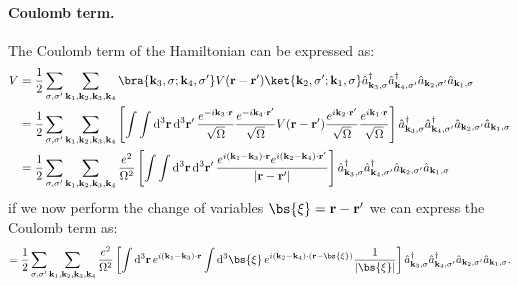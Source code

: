 \paragraph{Coulomb term.}
The Coulomb term of the Hamiltonian can be expressed as:
\[
    \begin{aligned}
        V & = \frac{1}{2} \sum_{\sigma,\sigma^{\prime}} \sum_{\mathbf{k}_1, \mathbf{k}_2, \mathbf{k}_3, \mathbf{k}_4} \bra{\mathbf{k}_3, \sigma; \mathbf{k}_4, \sigma^{\prime}} V(\mathbf{r} - \mathbf{r}') \ket{\mathbf{k}_2, \sigma^{\prime}; \mathbf{k}_1, \sigma} \hat{a}_{\mathbf{k}_3, \sigma}^\dagger \hat{a}_{\mathbf{k}_4, \sigma^{\prime}}^\dagger \hat{a}_{\mathbf{k}_2, \sigma^{\prime}} \hat{a}_{\mathbf{k}_1, \sigma}                                                                                                                                                                                                         \\
          & = \frac{1}{2} \sum_{\sigma,\sigma^{\prime}} \sum_{\mathbf{k}_1, \mathbf{k}_2, \mathbf{k}_3, \mathbf{k}_4} \left[ \int \int \mathrm{d}^3 \mathbf{r} \, \mathrm{d}^3 \mathbf{r}' \, \frac{e^{-i \mathbf{k}_3 \cdot \mathbf{r}}}{\sqrt{\Omega}} \frac{e^{-i \mathbf{k}_4 \cdot \mathbf{r}'}}{\sqrt{\Omega}} V(\mathbf{r} - \mathbf{r}') \frac{e^{i \mathbf{k}_2 \cdot \mathbf{r}'}}{\sqrt{\Omega}} \frac{e^{i \mathbf{k}_1 \cdot \mathbf{r}}}{\sqrt{\Omega}} \right] \hat{a}_{\mathbf{k}_3, \sigma}^\dagger \hat{a}_{\mathbf{k}_4, \sigma^{\prime}}^\dagger \hat{a}_{\mathbf{k}_2, \sigma^{\prime}} \hat{a}_{\mathbf{k}_1, \sigma} \\
          & = \frac{1}{2} \sum_{\sigma,\sigma^{\prime}} \sum_{\mathbf{k}_1, \mathbf{k}_2, \mathbf{k}_3, \mathbf{k}_4} \frac{e^2}{\Omega^2}\left[ \int \int \mathrm{d}^3 \mathbf{r} \, \mathrm{d}^3 \mathbf{r}' \, \frac{e^{i (\mathbf{k}_1 - \mathbf{k}_3) \cdot \mathbf{r}} e^{i (\mathbf{k}_2 - \mathbf{k}_4) \cdot \mathbf{r}'}}{\vert \mathbf{r} - \mathbf{r}^{\prime} \vert} \right] \hat{a}_{\mathbf{k}_3, \sigma}^\dagger \hat{a}_{\mathbf{k}_4, \sigma^{\prime}}^\dagger \hat{a}_{\mathbf{k}_2, \sigma^{\prime}} \hat{a}_{\mathbf{k}_1, \sigma}                                                                                     \\
    \end{aligned}
\]
if we now perform the change of variables $\bs{\xi} = \mathbf{r} - \mathbf{r}'$ we can express the Coulomb term as:
\[
    \begin{aligned}
        = \frac{1}{2} \sum_{\sigma,\sigma^{\prime}} \sum_{\mathbf{k}_1, \mathbf{k}_2, \mathbf{k}_3, \mathbf{k}_4} \frac{e^2}{\Omega^2} \left[ \int \mathrm{d}^3 \mathbf{r} \, e^{i (\mathbf{k}_1 - \mathbf{k}_3) \cdot \mathbf{r}} \int \mathrm{d}^3 \bs{\xi} \, e^{i (\mathbf{k}_2 - \mathbf{k}_4) \cdot (\mathbf{r} - \bs{\xi})} \frac{1}{\vert \bs{\xi} \vert} \right] \hat{a}_{\mathbf{k}_3, \sigma}^\dagger \hat{a}_{\mathbf{k}_4, \sigma^{\prime}}^\dagger \hat{a}_{\mathbf{k}_2, \sigma^{\prime}} \hat{a}_{\mathbf{k}_1, \sigma}.
    \end{aligned}
\]
